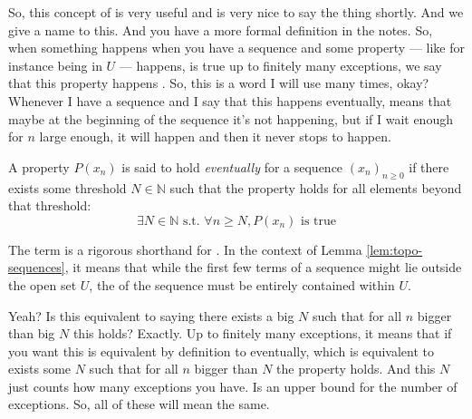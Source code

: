 \begin{spoken-clean}[00:11:14 - 00:12:51]
So, this concept of  is very useful and is very nice to say the thing shortly. And we give a name to this. And you have a more formal definition in the notes. So, when something happens when you have a sequence and some property --- like for instance being in $U$ --- happens, is true up to finitely many exceptions, we say that this property happens . So, this is a word I will use many times, okay? Whenever I have a sequence and I say that this happens eventually, means that maybe at the beginning of the sequence it's not happening, but if I wait enough for $n$ large enough, it will happen and then it never stops to happen.
\end{spoken-clean}

\begin{math-stroke}
\setcounter{theorem}{16}
\begin{definition}[Eventually]\label{def:eventually-v2}
A property $P(x_n)$ is said to hold \emph{eventually} for a sequence $(x_n)_{n \ge 0}$ if there exists some threshold $N \in \mathbb{N}$ such that the property holds for all elements beyond that threshold:
\[ \exists N \in \mathbb{N} \text{ s.t. } \forall n \ge N, P(x_n) \text{ is true} \]
\end{definition}

\begin{explanation-of-steps}
The term  is a rigorous shorthand for . In the context of Lemma \ref{lem:topo-sequences}, it means that while the first few terms of a sequence might lie outside the open set $U$, the  of the sequence must be entirely contained within $U$.
\end{explanation-of-steps}
\end{math-stroke}

\begin{spoken-clean}[00:12:51 - 00:13:12]
Yeah?  Is this  equivalent to saying there exists a big $N$ such that for all $n$ bigger than big $N$ this holds? Exactly. Up to finitely many exceptions, it means that if you want this is equivalent by definition to eventually, which is equivalent to exists some $N$ such that for all $n$ bigger than $N$ the property holds. And this $N$ just counts how many exceptions you have. Is an upper bound for the number of exceptions. So, all of these will mean the same.
\end{spoken-clean}

